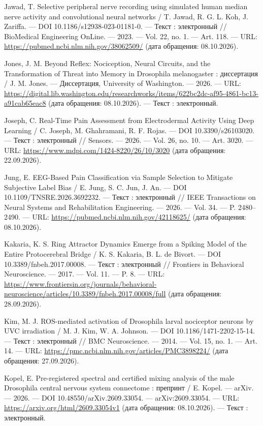 \begin{list}{}{\setlength{\leftmargin}{10mm}\setlength{\labelwidth}{8mm}\setlength{\labelsep}{2mm}\setlength{\itemsep}{0pt}\setlength{\parsep}{0pt}\setlength{\topsep}{0pt}}
\item[164.] Jawad, T. Selective peripheral nerve recording using simulated human median nerve activity and convolutional neural networks / T. Jawad, R. G. L. Koh, J. Zariffa. — DOI 10.1186/s12938-023-01181-0. — Текст : электронный // BioMedical Engineering OnLine. — 2023. — Vol. 22, no. 1. — Art. 118. — URL: \url{https://pubmed.ncbi.nlm.nih.gov/38062509/} (дата обращения: 08.10.2026).
\item[165.] Jones, J. M. Beyond Reflex: Nociception, Neural Circuits, and the Transformation of Threat into Memory in Drosophila melanogaster : диссертация / J. M. Jones. — Диссертация, University of Washington. — 2026. — URL: \url{https://digital.lib.washington.edu/researchworks/items/622bc2dc-af95-4861-bc13-a91cab65eac8} (дата обращения: 08.10.2026). — Текст : электронный.
\item[166.] Joseph, C. Real-Time Pain Assessment from Electrodermal Activity Using Deep Learning / C. Joseph, M. Ghahramani, R. F. Rojas. — DOI 10.3390/s26103020. — Текст : электронный // Sensors. — 2026. — Vol. 26, no. 10. — Art. 3020. — URL: \url{https://www.mdpi.com/1424-8220/26/10/3020} (дата обращения: 22.09.2026).
\item[167.] Jung, E. EEG-Based Pain Classification via Sample Selection to Mitigate Subjective Label Bias / E. Jung, S. C. Jun, J. An. — DOI 10.1109/TNSRE.2026.3692232. — Текст : электронный // IEEE Transactions on Neural Systems and Rehabilitation Engineering. — 2026. — Vol. 34. — P. 2480–2490. — URL: \url{https://pubmed.ncbi.nlm.nih.gov/42118625/} (дата обращения: 08.10.2026).
\item[168.] Kakaria, K. S. Ring Attractor Dynamics Emerge from a Spiking Model of the Entire Protocerebral Bridge / K. S. Kakaria, B. L. de Bivort. — DOI 10.3389/fnbeh.2017.00008. — Текст : электронный // Frontiers in Behavioral Neuroscience. — 2017. — Vol. 11. — P. 8. — URL: \url{https://www.frontiersin.org/journals/behavioral-neuroscience/articles/10.3389/fnbeh.2017.00008/full} (дата обращения: 28.09.2026).
\item[169.] Kim, M. J. ROS-mediated activation of Drosophila larval nociceptor neurons by UVC irradiation / M. J. Kim, W. A. Johnson. — DOI 10.1186/1471-2202-15-14. — Текст : электронный // BMC Neuroscience. — 2014. — Vol. 15, no. 1. — Art. 14. — URL: \url{https://pmc.ncbi.nlm.nih.gov/articles/PMC3898224/} (дата обращения: 27.09.2026).
\item[170.] Kopel, E. Pre-registered spectral and certified mixing analysis of the male Drosophila central nervous system connectome : препринт / E. Kopel. — arXiv. — 2026. — DOI 10.48550/arXiv.2609.33054. — arXiv:2609.33054. — URL: \url{https://arxiv.org/html/2609.33054v1} (дата обращения: 08.10.2026). — Текст : электронный.

\end{list}
